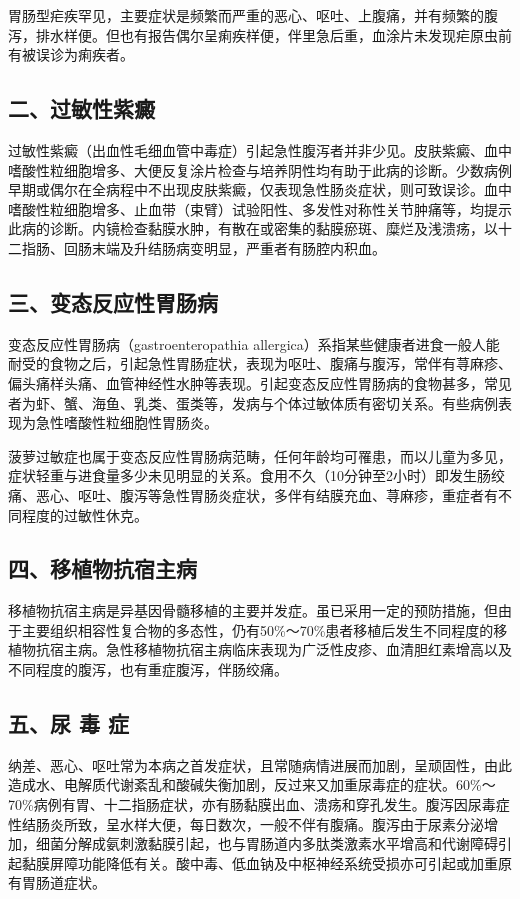 胃肠型疟疾罕见，主要症状是频繁而严重的恶心、呕吐、上腹痛，并有频繁的腹泻，排水样便。但也有报告偶尔呈痢疾样便，伴里急后重，血涂片未发现疟原虫前有被误诊为痢疾者。

\subsection{二、过敏性紫癜}

过敏性紫癜（出血性毛细血管中毒症）引起急性腹泻者并非少见。皮肤紫癜、血中嗜酸性粒细胞增多、大便反复涂片检查与培养阴性均有助于此病的诊断。少数病例早期或偶尔在全病程中不出现皮肤紫癜，仅表现急性肠炎症状，则可致误诊。血中嗜酸性粒细胞增多、止血带（束臂）试验阳性、多发性对称性关节肿痛等，均提示此病的诊断。内镜检查黏膜水肿，有散在或密集的黏膜瘀斑、糜烂及浅溃疡，以十二指肠、回肠末端及升结肠病变明显，严重者有肠腔内积血。

\subsection{三、变态反应性胃肠病}

变态反应性胃肠病（gastroenteropathia
allergica）系指某些健康者进食一般人能耐受的食物之后，引起急性胃肠症状，表现为呕吐、腹痛与腹泻，常伴有荨麻疹、偏头痛样头痛、血管神经性水肿等表现。引起变态反应性胃肠病的食物甚多，常见者为虾、蟹、海鱼、乳类、蛋类等，发病与个体过敏体质有密切关系。有些病例表现为急性嗜酸性粒细胞性胃肠炎。

菠萝过敏症也属于变态反应性胃肠病范畴，任何年龄均可罹患，而以儿童为多见，症状轻重与进食量多少未见明显的关系。食用不久（10分钟至2小时）即发生肠绞痛、恶心、呕吐、腹泻等急性胃肠炎症状，多伴有结膜充血、荨麻疹，重症者有不同程度的过敏性休克。

\subsection{四、移植物抗宿主病}

移植物抗宿主病是异基因骨髓移植的主要并发症。虽已采用一定的预防措施，但由于主要组织相容性复合物的多态性，仍有50\%～70\%患者移植后发生不同程度的移植物抗宿主病。急性移植物抗宿主病临床表现为广泛性皮疹、血清胆红素增高以及不同程度的腹泻，也有重症腹泻，伴肠绞痛。

\subsection{五、尿 毒 症}

纳差、恶心、呕吐常为本病之首发症状，且常随病情进展而加剧，呈顽固性，由此造成水、电解质代谢紊乱和酸碱失衡加剧，反过来又加重尿毒症的症状。60\%～70\%病例有胃、十二指肠症状，亦有肠黏膜出血、溃疡和穿孔发生。腹泻因尿毒症性结肠炎所致，呈水样大便，每日数次，一般不伴有腹痛。腹泻由于尿素分泌增加，细菌分解成氨刺激黏膜引起，也与胃肠道内多肽类激素水平增高和代谢障碍引起黏膜屏障功能降低有关。酸中毒、低血钠及中枢神经系统受损亦可引起或加重原有胃肠道症状。

